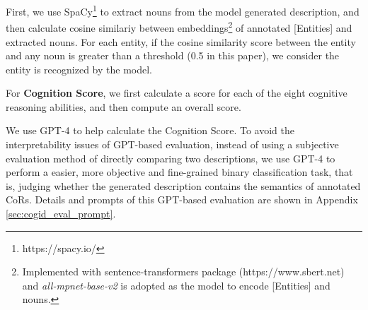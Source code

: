 First, we use SpaCy\footnote{https://spacy.io/} to extract nouns from the model generated description, and then calculate cosine similariy between embeddings\footnote{Implemented with sentence-transformers package (https://www.sbert.net) and \textit{all-mpnet-base-v2} is adopted as the model to encode [Entities] and nouns.} of annotated [Entities] and extracted nouns. 
For each entity, if the cosine similarity score between the entity and any noun is greater than a threshold (0.5 in this paper), we consider the entity is recognized by the model. 



For \textbf{Cognition Score}, we first calculate a score for each of the eight cognitive reasoning abilities, and then compute an overall score.

We use GPT-4 \cite{openai2023gpt4} to help calculate the Cognition Score.
To avoid the interpretability issues of GPT-based evaluation, instead of using a subjective evaluation method of directly comparing two descriptions, we use GPT-4 to perform a easier, more objective and fine-grained binary classification task, that is, judging whether the generated description contains the semantics of annotated CoRs.
Details and prompts of this GPT-based evaluation are shown in Appendix \ref{sec:cogid_eval_prompt}.

